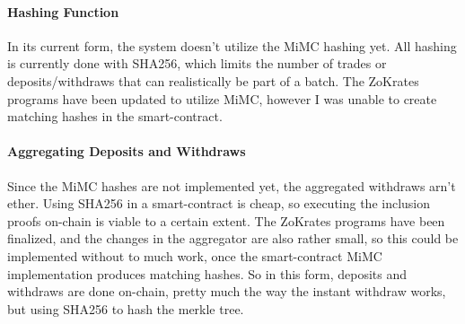 \documentclass[../../thesis.tex]{subfiles}
\begin{document}
\paragraph{Hashing Function}
In its current form, the system doesn't utilize the MiMC hashing yet. All hashing is currently done with SHA256, which limits the number of trades or deposits/withdraws that can realistically be part of a batch. The ZoKrates programs have been updated to utilize MiMC, however I was unable to create matching hashes in the smart-contract.

\paragraph{Aggregating Deposits and Withdraws}
Since the MiMC hashes are not implemented yet, the aggregated withdraws arn't ether. Using SHA256 in a smart-contract is cheap, so executing the inclusion proofs on-chain is viable to a certain extent. The ZoKrates programs have been finalized, and the changes in the aggregator are also rather small, so this could be implemented without to much work, once the smart-contract MiMC implementation produces matching hashes. So in this form, deposits and withdraws are done on-chain, pretty much the way the instant withdraw works, but using SHA256 to hash the merkle tree. 
\end{document}
